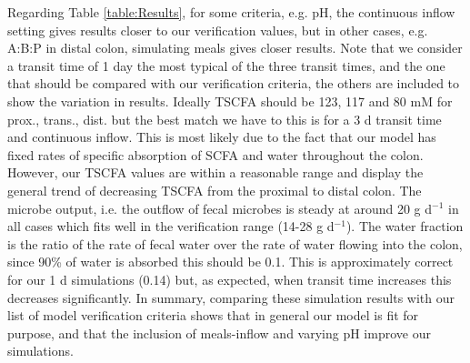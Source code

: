 \documentclass[a4paper]{article}
\begin{document}
Regarding Table \ref{table:Results}, for some criteria, e.g. pH, the continuous inflow setting gives results closer to our verification values, but in other cases, e.g. A:B:P in distal colon, simulating meals gives closer results. 
Note that we consider a transit time of 1 day the most typical of the three transit times, and the one that should be compared with our verification criteria, the others are included to show the variation in results.
Ideally TSCFA should be 123, 117 and 80 mM for prox., trans., dist. but the best match we have to this is for a 3 d transit time and continuous inflow. 
This is most likely due to the fact that our model has fixed rates of specific absorption of SCFA and water throughout the colon.
However, our TSCFA values are within a reasonable range and display the general trend of decreasing TSCFA from the proximal to distal colon.
The microbe output, i.e. the outflow of fecal microbes is steady at around 20 g d$^{-1}$ in all cases which fits well in the verification range (14-28 g d$^{-1}$).
The water fraction is the ratio of the rate of fecal water over the rate of water flowing into the colon, since 90\% of water is absorbed this should be 0.1. This is approximately correct for our 1 d simulations (0.14) but, as expected, when transit time increases this decreases significantly.
In summary, comparing these simulation results with our list of model verification criteria shows that in general our model is fit for purpose, and that the inclusion of meals-inflow and varying pH improve our simulations. 
\end{document}
